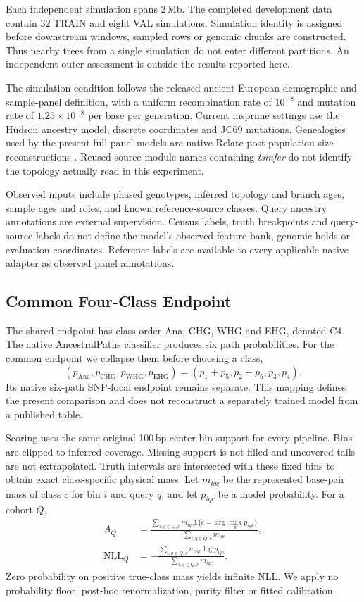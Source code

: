 \documentclass[letterpaper]{article}
\begin{document}
Each independent simulation spans 2\,Mb. The completed development data contain 32 TRAIN and eight VAL simulations. Simulation identity is assigned before downstream windows, sampled rows or genomic chunks are constructed. Thus nearby trees from a single simulation do not enter different partitions. An independent outer assessment is outside the results reported here.

The simulation condition follows the released ancient-European demographic and sample-panel definition, with a uniform recombination rate of $10^{-8}$ and mutation rate of $1.25\times10^{-8}$ per base per generation. Current msprime \citep{msprime2022} settings use the Hudson ancestry model, discrete coordinates and JC69 mutations. Genealogies used by the present full-panel models are native Relate post-population-size reconstructions \citep{relate2019}. Reused source-module names containing \emph{tsinfer} do not identify the topology actually read in this experiment.

Observed inputs include phased genotypes, inferred topology and branch ages, sample ages and roles, and known reference-source classes. Query ancestry annotations are external supervision. Census labels, truth breakpoints and query-source labels do not define the model's observed feature bank, genomic holds or evaluation coordinates. Reference labels are available to every applicable native adapter as observed panel annotations.

\subsection{Common Four-Class Endpoint}
The shared endpoint has class order Ana, CHG, WHG and EHG, denoted C4. The native AncestralPaths classifier produces six path probabilities. For the common endpoint we collapse them before choosing a class,
\begin{equation}
(p_{\mathrm{Ana}},p_{\mathrm{CHG}},p_{\mathrm{WHG}},p_{\mathrm{EHG}})
=(p_1+p_5,p_2+p_6,p_3,p_4).
\end{equation}
Its native six-path SNP-focal endpoint remains separate. This mapping defines the present comparison and does not reconstruct a separately trained model from a published table.

Scoring uses the same original 100\,bp center-bin support for every pipeline. Bins are clipped to inferred coverage. Missing support is not filled and uncovered tails are not extrapolated. Truth intervals are intersected with these fixed bins to obtain exact class-specific physical mass. Let $m_{iqc}$ be the represented base-pair mass of class $c$ for bin $i$ and query $q$, and let $p_{iqc}$ be a model probability. For a cohort $Q$,
\begin{align}
A_Q&=\frac{\sum_{i,q\in Q,c}m_{iqc}
 \mathbf{1}\{c=\arg\max_k p_{iqk}\}}
 {\sum_{i,q\in Q,c}m_{iqc}},\\
\mathrm{NLL}_Q&=-\frac{\sum_{i,q\in Q,c}m_{iqc}\log p_{iqc}}
 {\sum_{i,q\in Q,c}m_{iqc}}.
\end{align}
Zero probability on positive true-class mass yields infinite NLL. We apply no probability floor, post-hoc renormalization, purity filter or fitted calibration.
\end{document}
